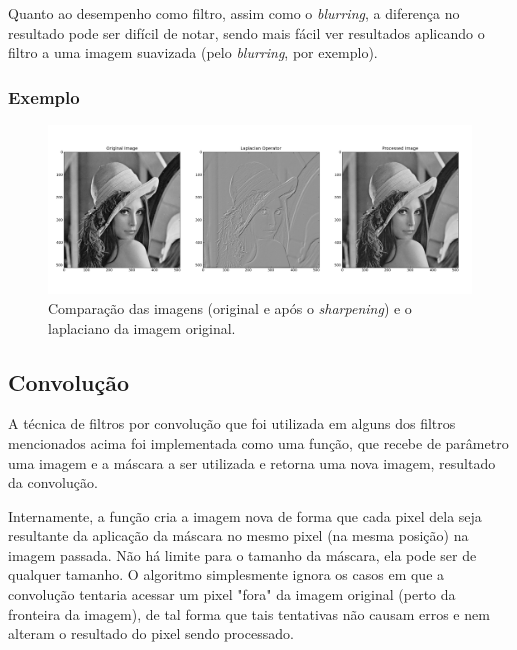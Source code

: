 Quanto ao desempenho como filtro, assim como o \textit{blurring}, a diferença no resultado pode ser difícil de notar,
sendo mais fácil ver resultados aplicando o filtro a uma imagem suavizada (pelo \textit{blurring}, por exemplo).

\subsubsection{Exemplo}
\begin{figure}[htb]
    \centering
    \includegraphics[width=1.0\textwidth]{sharpen_example.png}
    \caption{Comparação das imagens (original e após o \textit{sharpening}) e o laplaciano da imagem original.}
    \label{fig:ex_sharpen}
\end{figure}
\pagebreak

\subsection{Convolução}
A técnica de filtros por convolução que foi utilizada em alguns dos filtros mencionados acima foi implementada como uma
função, que recebe de parâmetro uma imagem e a máscara a ser utilizada e retorna uma nova imagem, resultado da convolução.

Internamente, a função cria a imagem nova de forma que cada pixel dela seja resultante da aplicação da máscara no mesmo
pixel (na mesma posição) na imagem passada. Não há limite para o tamanho da máscara, ela pode ser de qualquer tamanho.
O algoritmo simplesmente ignora os casos em que a convolução tentaria acessar um pixel "fora" da imagem original (perto
da fronteira da imagem), de tal forma que tais tentativas não causam erros e nem alteram o resultado do pixel sendo processado.


